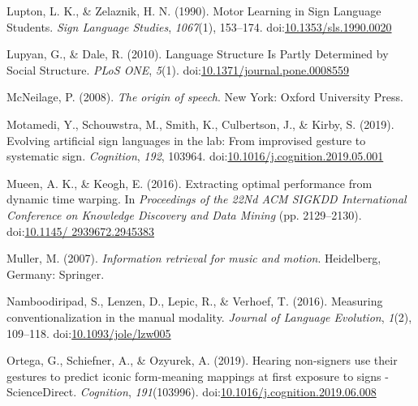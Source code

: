 \documentclass[
  man, noextraspace,floatsintext]{apa6}
\newlength{\cslhangindent}
\newenvironment{cslreferences}%
  {\setlength{\parindent}{0pt}%
  \everypar{\setlength{\hangindent}{\cslhangindent}}\ignorespaces}%
  {\par}
\begin{document}
\begin{cslreferences}
\leavevmode\hypertarget{ref-luptonMotorLearningSign1990}{}%
Lupton, L. K., \& Zelaznik, H. N. (1990). Motor Learning in Sign Language Students. \emph{Sign Language Studies}, \emph{1067}(1), 153--174. doi:\href{https://doi.org/10.1353/sls.1990.0020}{10.1353/sls.1990.0020}

\leavevmode\hypertarget{ref-lupyanLanguageStructurePartly2010}{}%
Lupyan, G., \& Dale, R. (2010). Language Structure Is Partly Determined by Social Structure. \emph{PLoS ONE}, \emph{5}(1). doi:\href{https://doi.org/10.1371/journal.pone.0008559}{10.1371/journal.pone.0008559}

\leavevmode\hypertarget{ref-mcneilageOriginSpeech2008}{}%
McNeilage, P. (2008). \emph{The origin of speech}. New York: Oxford University Press.

\leavevmode\hypertarget{ref-motamediEvolvingArtificialSign2019}{}%
Motamedi, Y., Schouwstra, M., Smith, K., Culbertson, J., \& Kirby, S. (2019). Evolving artificial sign languages in the lab: From improvised gesture to systematic sign. \emph{Cognition}, \emph{192}, 103964. doi:\href{https://doi.org/10.1016/j.cognition.2019.05.001}{10.1016/j.cognition.2019.05.001}

\leavevmode\hypertarget{ref-mueenExtractingOptimalPerformance2016a}{}%
Mueen, A. K., \& Keogh, E. (2016). Extracting optimal performance from dynamic time warping. In \emph{Proceedings of the 22Nd ACM SIGKDD International Conference on Knowledge Discovery and Data Mining} (pp. 2129--2130). doi:\href{https://doi.org/10.1145/\%202939672.2945383}{10.1145/ 2939672.2945383}

\leavevmode\hypertarget{ref-mullerInformationRetrievalMusic2007}{}%
Muller, M. (2007). \emph{Information retrieval for music and motion}. Heidelberg, Germany: Springer.

\leavevmode\hypertarget{ref-namboodiripadMeasuringConventionalizationManual2016}{}%
Namboodiripad, S., Lenzen, D., Lepic, R., \& Verhoef, T. (2016). Measuring conventionalization in the manual modality. \emph{Journal of Language Evolution}, \emph{1}(2), 109--118. doi:\href{https://doi.org/10.1093/jole/lzw005}{10.1093/jole/lzw005}

\leavevmode\hypertarget{ref-ortegaHearingNonsignersUse2019}{}%
Ortega, G., Schiefner, A., \& Ozyurek, A. (2019). Hearing non-signers use their gestures to predict iconic form-meaning mappings at first exposure to signs - ScienceDirect. \emph{Cognition}, \emph{191}(103996). doi:\href{https://doi.org/10.1016/j.cognition.2019.06.008}{10.1016/j.cognition.2019.06.008}


\end{cslreferences}
\end{document}
